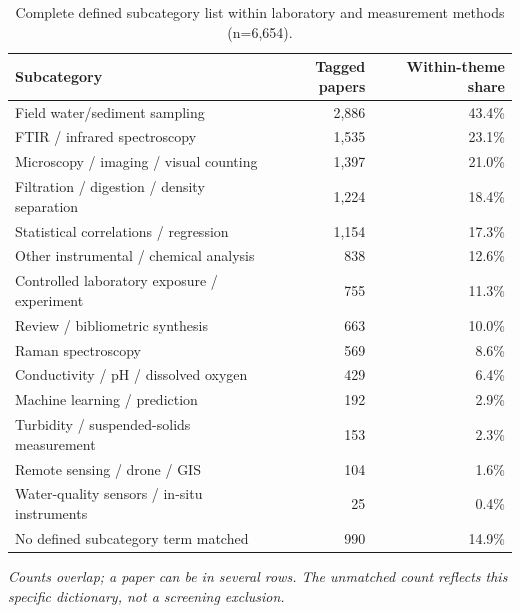 \documentclass[10pt,a4paper]{article}
\begin{document}
\begin{table}[H]\centering\footnotesize
\caption{Complete defined subcategory list within laboratory and measurement methods (n=6,654).}
\begin{tabularx}{\linewidth}{@{}Xrr@{}}\toprule Subcategory & Tagged papers & Within-theme share \\ \midrule
Field water/sediment sampling & 2,886 & 43.4\% \\
FTIR / infrared spectroscopy & 1,535 & 23.1\% \\
Microscopy / imaging / visual counting & 1,397 & 21.0\% \\
Filtration / digestion / density separation & 1,224 & 18.4\% \\
Statistical correlations / regression & 1,154 & 17.3\% \\
Other instrumental / chemical analysis & 838 & 12.6\% \\
Controlled laboratory exposure / experiment & 755 & 11.3\% \\
Review / bibliometric synthesis & 663 & 10.0\% \\
Raman spectroscopy & 569 & 8.6\% \\
Conductivity / pH / dissolved oxygen & 429 & 6.4\% \\
Machine learning / prediction & 192 & 2.9\% \\
Turbidity / suspended-solids measurement & 153 & 2.3\% \\
Remote sensing / drone / GIS & 104 & 1.6\% \\
Water-quality sensors / in-situ instruments & 25 & 0.4\% \\
\midrule
No defined subcategory term matched & 990 & 14.9\% \\
\bottomrule\end{tabularx}\end{table}
\noindent\footnotesize\emph{Counts overlap; a paper can be in several rows. The unmatched count reflects this specific dictionary, not a screening exclusion.}\normalsize
\end{document}
